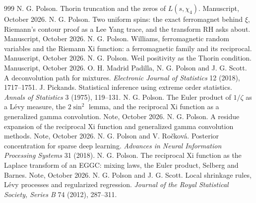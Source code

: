 \begin{thebibliography}{999}
 N. G. Polson. Thorin truncation and the zeros of $L(s,\chi_4)$. Manuscript, October 2026.
 N. G. Polson. Two uniform spins: the exact ferromagnet behind $\xi$, Riemann's contour proof as a Lee Yang trace, and the transform RH asks about. Manuscript, October 2026.
 N. G. Polson. Williams, ferromagnetic random variables and the Riemann Xi function: a ferromagnetic family and its reciprocal. Manuscript, October 2026.
 N. G. Polson. Weil positivity as the Thorin condition. Manuscript, October 2026.
 O. H. Madrid Padilla, N. G. Polson and J. G. Scott. A deconvolution path for mixtures. \emph{Electronic Journal of Statistics} 12 (2018), 1717--1751.
 J. Pickands. Statistical inference using extreme order statistics. \emph{Annals of Statistics} 3 (1975), 119--131.
 N. G. Polson. The Euler product of $1/\zeta$ as a L\'evy measure, the $2\sin^2$ lemma, and the reciprocal Xi function as a generalized gamma convolution. Note, October 2026.
 N. G. Polson. A residue expansion of the reciprocal Xi function and generalized gamma convolution methods. Note, October 2026.
 N. G. Polson and V. Ro\v{c}kov\'a. Posterior concentration for sparse deep learning. \emph{Advances in Neural Information Processing Systems} 31 (2018).
 N. G. Polson. The reciprocal Xi function as the Laplace transform of an EGGC: mixing laws, the Euler product, Selberg and Barnes. Note, October 2026.
 N. G. Polson and J. G. Scott. Local shrinkage rules, L\'evy processes and regularized regression. \emph{Journal of the Royal Statistical Society, Series B} 74 (2012), 287--311.

\end{thebibliography}
